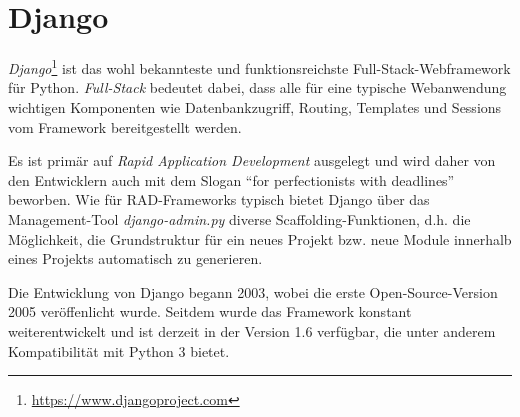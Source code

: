 \section{Django}\label{frameworks-django}

\emph{Django}\footnote{\href{https://www.djangoproject.com}{https://www.djangoproject.com}} ist das
wohl bekannteste und funktionsreichste Full-Stack-Webframework für Python. \emph{Full-Stack}
bedeutet dabei, dass alle für eine typische Webanwendung wichtigen Komponenten wie Datenbankzugriff,
Routing, Templates und Sessions vom Framework bereitgestellt werden.

Es ist primär auf \emph{Rapid Application Development} ausgelegt und wird daher von den Entwicklern
auch mit dem Slogan \enquote{for perfectionists with deadlines} beworben. Wie für RAD-Frameworks
typisch bietet Django über das Management-Tool \emph{django-admin.py} diverse
Scaffolding-Funktionen, d.h. die Möglichkeit, die Grundstruktur für ein neues Projekt bzw. neue
Module innerhalb eines Projekts automatisch zu generieren.

Die Entwicklung von Django begann 2003, wobei die erste Open-Source-Version 2005 veröffenlicht
wurde. Seitdem wurde das Framework konstant weiterentwickelt und ist derzeit in der Version 1.6
verfügbar, die unter anderem Kompatibilität mit Python 3 bietet.


